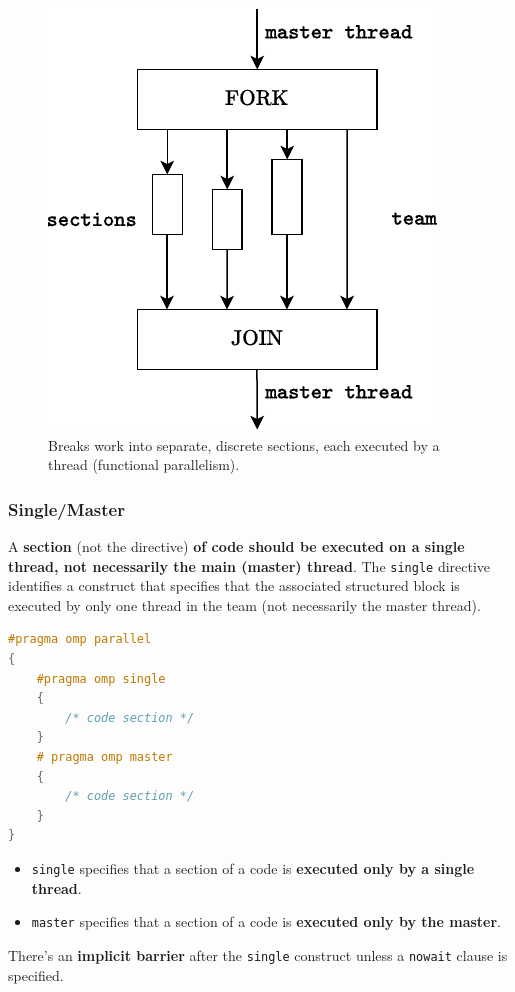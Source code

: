 \begin{figure}[!htp]
    \centering
    \includegraphics[width=.45\textwidth]{img/openmp-sections-1.pdf}
    \caption{Breaks work into separate, discrete sections, each executed by a thread (functional parallelism).}
\end{figure}

\newpage

\subsubsection{Single/Master}

A \textbf{section} (not the directive) \textbf{of code should be executed on a single thread, not necessarily the main (master) thread}. The \texttt{single} directive identifies a construct that specifies that the associated structured block is executed by only one thread in the team (not necessarily the master thread).

\begin{openmpbox}
\begin{lstlisting}[language=C++]
#pragma omp parallel
{
    #pragma omp single
    {
        /* code section */
    }
    # pragma omp master
    {
        /* code section */
    }
}\end{lstlisting}
\end{openmpbox}

\begin{itemize}
    \item \texttt{single} specifies that a section of a code is \textbf{executed only by a single thread}.

    \item \texttt{master} specifies that a section of a code is \textbf{executed only by the master}.
\end{itemize}

\noindent
There's an \textbf{implicit barrier} after the \texttt{single} construct unless a \texttt{nowait} clause is specified.


